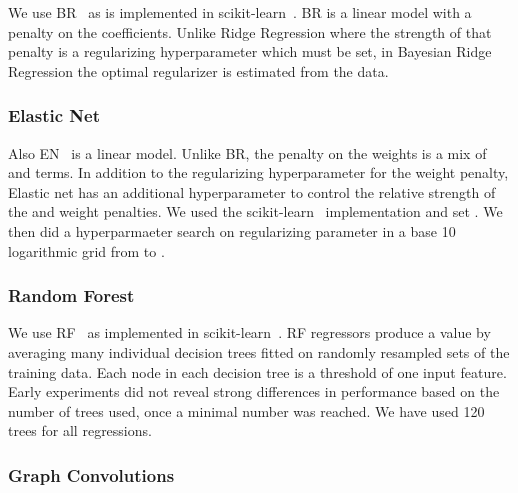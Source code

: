 \documentclass[reprint, superscriptaddress,
amsmath,amssymb, aps, prb,
]{revtex4-1}
\begin{document}
{We use BR~\cite{Neal:1996:BLN:525544} as is implemented in scikit-learn~\cite{scikit-learn}. 
BR is a linear model with a  penalty on the coefficients. 
Unlike Ridge Regression where the strength of that penalty is a regularizing hyperparameter which must be set, 
in Bayesian Ridge Regression the optimal regularizer is estimated from the data.

\subsubsection{Elastic Net}

Also EN~\cite{RSSB:RSSB503} is a linear model. Unlike BR, the penalty on the weights is a mix of  and  terms. In addition to the regularizing hyperparameter for the weight penalty, Elastic net has an additional hyperparameter  to control the relative strength of the  and  weight penalties.  
We used the scikit-learn~\cite{scikit-learn} implementation and set . We then did a hyperparmaeter search on regularizing parameter in a base 10 logarithmic grid from  to .

\subsubsection{Random Forest}

We use RF~\cite{breiman2001random} as implemented in scikit-learn~\cite{scikit-learn}. RF regressors produce a value by averaging many individual decision trees fitted on randomly resampled sets of the training data. Each node in each decision tree is a threshold of one input feature.
Early experiments did not reveal strong differences in performance based on the number of trees used, once a minimal number was reached. 
We have used 120 trees for all regressions.


\subsubsection{Graph Convolutions}

}
\end{document}
